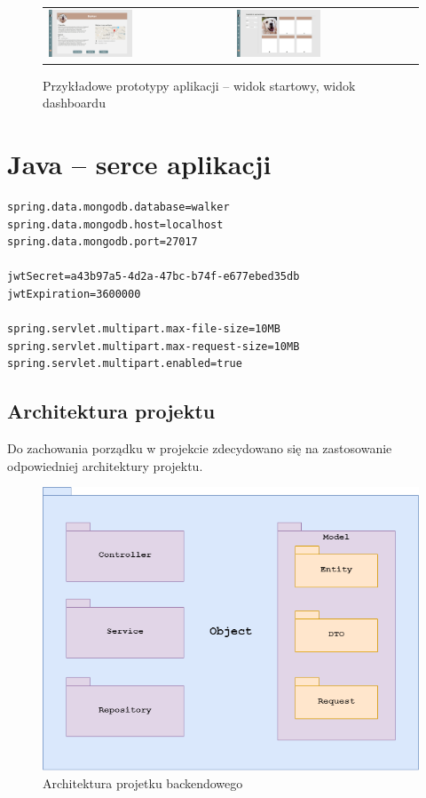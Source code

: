 \begin{figure}[H]
    \centering
      \begin{tabular}{@{}ll@{}}
        \includegraphics[width=0.475\textwidth]{rysunki/Home -walk info.png} & 
        \includegraphics[width=0.475\textwidth]{rysunki/Home - dog list.png}
      \end{tabular}
    \caption{Przykładowe prototypy aplikacji -- widok startowy, widok dashboardu}
    \label{fig:mocks-lists}
\end{figure}

\newpage
\section{Java -- serce aplikacji}
\begin{lstlisting}
spring.data.mongodb.database=walker
spring.data.mongodb.host=localhost
spring.data.mongodb.port=27017

jwtSecret=a43b97a5-4d2a-47bc-b74f-e677ebed35db
jwtExpiration=3600000

spring.servlet.multipart.max-file-size=10MB
spring.servlet.multipart.max-request-size=10MB
spring.servlet.multipart.enabled=true
\end{lstlisting}

\subsection{Architektura projektu}
Do zachowania porządku w projekcie zdecydowano się na zastosowanie odpowiedniej architektury projektu.

\begin{figure}[H]
  \centering
  \includegraphics[width=0.7\linewidth]{rysunki/packages.png}
  \caption{Architektura projetku backendowego}
  \label{fig:java-architecture-2}
\end{figure}

